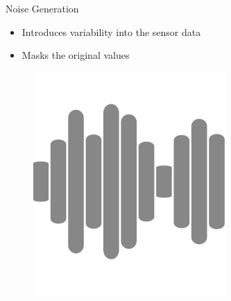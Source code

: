 \documentclass[aspectratio=169]{beamer}
[aspectratio=169] %
\begin{document}
\begin{frame}{Noise Generation}
  \begin{minipage}{0.49\textwidth} 
    \begin{itemize}
      \item Introduces variability into the sensor data
      \item Masks the original values
    \end{itemize}
  \end{minipage}
  \hfill
  \begin{minipage}{0.49\textwidth} 
    \begin{figure}
      \centering
      \includegraphics[height=0.5\textheight]{figures/noise.png}
    \end{figure}
  \end{minipage}
\end{frame}
\end{document}
